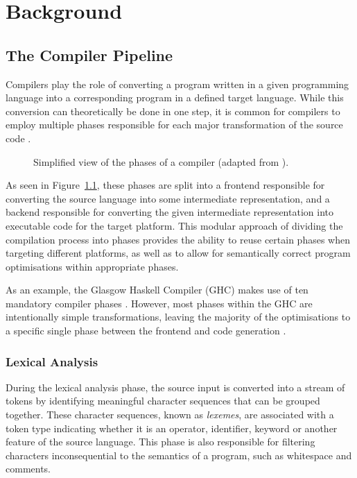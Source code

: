 \chapter{Background}
\label{sec:background}

\section{The Compiler Pipeline}

Compilers play the role of converting a program written in a given programming language into a
corresponding program in a defined target language. While this conversion can theoretically be done
in one step, it is common for compilers to employ multiple phases responsible for each major
transformation of the source code \autocite{grune2012modern}.

\begin{figure}
    \centering
    
    \caption{Simplified view of the phases of a compiler (adapted from \autocite{grune2012modern}).}
    \label{fig:compiler-pipeline}
\end{figure}

As seen in Figure~\ref{fig:compiler-pipeline}, these phases are split into a frontend responsible
for converting the source language into some intermediate representation, and a backend responsible
for converting the given intermediate representation into executable code for the target platform.
This modular approach of dividing the compilation process into phases provides the ability to reuse
certain phases when targeting different platforms, as well as to allow for semantically correct
program optimisations within appropriate phases.

As an example, the Glasgow Haskell Compiler (GHC) makes use of ten mandatory compiler phases
\autocite{ghccompiler}. However, most phases within the GHC are intentionally simple
transformations, leaving the majority of the optimisations to a specific single phase between the
frontend and code generation \autocite{jones1997transformation}.

\subsection{Lexical Analysis}

During the lexical analysis phase, the source input is converted into a stream of tokens by
identifying meaningful character sequences that can be grouped together. These character sequences,
known as \emph{lexemes}, are associated with a token type indicating whether it is an operator,
identifier, keyword or another feature of the source language. This phase is also responsible for
filtering characters inconsequential to the semantics of a program, such as whitespace and comments.

